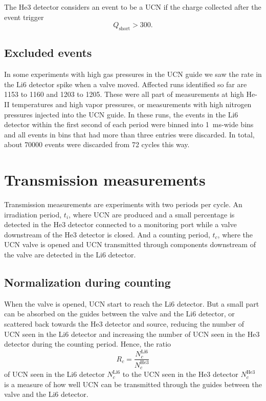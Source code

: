 \documentclass[10pt,letterpaper]{article}
\begin{document}
The He3 detector considers an event to be a UCN if the charge collected after the event trigger
\begin{equation}
Q_\mathrm{short} > 300.
\end{equation}

\subsection{Excluded events}

In some experiments with high gas pressures in the UCN guide we saw the rate in the Li6 detector spike when a valve moved. Affected runs identified so far are 1153 to 1160 and 1203 to 1205. These were all part of measurements at high He-II temperatures and high vapor pressures, or measurements with high nitrogen pressures injected into the UCN guide. In these runs, the events in the Li6 detector within the first second of each period were binned into \SI{1}{\milli\second}-wide bins and all events in bins that had more than three entries were discarded. In total, about \num{70000} events were discarded from 72 cycles this way.


\section{Transmission measurements}

Transmission measurements are experiments with two periods per cycle. An irradiation period, $t_i$, where UCN are produced and a small percentage is detected in the He3 detector connected to a monitoring port while a valve downstream of the He3 detector is closed. And a counting period, $t_c$, where the UCN valve is opened and UCN transmitted through components downstream of the valve are detected in the Li6 detector.

\subsection{Normalization during counting}

When the valve is opened, UCN start to reach the Li6 detector. But a small part can be absorbed on the guides between the valve and the Li6 detector, or scattered back towards the He3 detector and source, reducing the number of UCN seen in the Li6 detector and increasing the number of UCN seen in the He3 detector during the counting period. Hence, the ratio
\begin{equation}
R_c = \frac{N^\mathrm{Li6}_c}{N^\mathrm{He3}_c}
\end{equation}
of UCN seen in the Li6 detector $N^\mathrm{Li6}_c$ to the UCN seen in the He3 detector $N^\mathrm{He3}_c$ is a measure of how well UCN can be transmitted through the guides between the valve and the Li6 detector.
\end{document}
